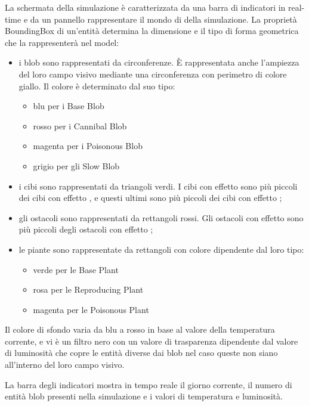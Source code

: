 La schermata della simulazione è caratterizzata da una barra di indicatori in real-time e da un pannello rappresentare il mondo di della simulazione. La proprietà BoundingBox di un'entità determina la dimensione e il tipo di forma geometrica che la rappresenterà nel model:

\begin{itemize}
	\item i blob sono rappresentati da circonferenze. È rappresentata anche l'ampiezza del loro campo visivo mediante una circonferenza con perimetro di colore giallo. Il colore è determinato dal suo tipo:
	\begin{itemize}
		\item blu per i Base Blob
		\item rosso per i Cannibal Blob
		\item magenta per i Poisonous Blob
		\item grigio per gli Slow Blob
	\end{itemize}
	\item i cibi sono rappresentati da triangoli verdi. I cibi con effetto  sono più piccoli dei cibi con effetto , e questi ultimi sono più piccoli dei cibi con effetto ;
	\item gli ostacoli sono rappresentati da rettangoli rossi. Gli ostacoli con effetto  sono più piccoli degli ostacoli con effetto ;
	\item le piante sono rappresentate da rettangoli con colore dipendente dal loro tipo:
	\begin{itemize}
		\item verde per le Base Plant
		\item rosa per le Reproducing Plant
		\item magenta per le Poisonous Plant
	\end{itemize}
\end{itemize}

Il colore di sfondo varia da blu a rosso in base al valore della temperatura corrente, e vi è un filtro nero con un valore di trasparenza dipendente dal valore di luminosità che copre le entità diverse dai blob nel caso queste non siano all'interno del loro campo visivo.

La barra degli indicatori mostra in tempo reale il giorno corrente, il numero di entità blob presenti nella simulazione e i valori di temperatura e luminosità.


